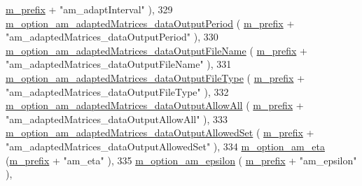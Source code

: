 \begin{DoxyCode}
      \hyperlink{class_q_u_e_s_o_1_1_metropolis_hastings_s_g_options_a4f7c510aaa530336d24259e2a89f5d0b}{m\_prefix} + \textcolor{stringliteral}{"am\_adaptInterval"}                          ),
329   \hyperlink{class_q_u_e_s_o_1_1_metropolis_hastings_s_g_options_ac9a445e5def0140cc6cda1288bce2766}{m\_option\_am\_adaptedMatrices\_dataOutputPeriod}       (
      \hyperlink{class_q_u_e_s_o_1_1_metropolis_hastings_s_g_options_a4f7c510aaa530336d24259e2a89f5d0b}{m\_prefix} + \textcolor{stringliteral}{"am\_adaptedMatrices\_dataOutputPeriod"}       ),
330   \hyperlink{class_q_u_e_s_o_1_1_metropolis_hastings_s_g_options_a50b5f394825d9c8848d11bd7636e2b5c}{m\_option\_am\_adaptedMatrices\_dataOutputFileName}     (
      \hyperlink{class_q_u_e_s_o_1_1_metropolis_hastings_s_g_options_a4f7c510aaa530336d24259e2a89f5d0b}{m\_prefix} + \textcolor{stringliteral}{"am\_adaptedMatrices\_dataOutputFileName"}     ),
331   \hyperlink{class_q_u_e_s_o_1_1_metropolis_hastings_s_g_options_a0f0a406b0e8cce9d82a4534dfb45c23b}{m\_option\_am\_adaptedMatrices\_dataOutputFileType}     (
      \hyperlink{class_q_u_e_s_o_1_1_metropolis_hastings_s_g_options_a4f7c510aaa530336d24259e2a89f5d0b}{m\_prefix} + \textcolor{stringliteral}{"am\_adaptedMatrices\_dataOutputFileType"}     ),
332   \hyperlink{class_q_u_e_s_o_1_1_metropolis_hastings_s_g_options_ac45686ae902b17824aa18e6414fc9039}{m\_option\_am\_adaptedMatrices\_dataOutputAllowAll}     (
      \hyperlink{class_q_u_e_s_o_1_1_metropolis_hastings_s_g_options_a4f7c510aaa530336d24259e2a89f5d0b}{m\_prefix} + \textcolor{stringliteral}{"am\_adaptedMatrices\_dataOutputAllowAll"}     ),
333   \hyperlink{class_q_u_e_s_o_1_1_metropolis_hastings_s_g_options_a850b7d178f40d3afbfc2e82cbbcaf25f}{m\_option\_am\_adaptedMatrices\_dataOutputAllowedSet}   (
      \hyperlink{class_q_u_e_s_o_1_1_metropolis_hastings_s_g_options_a4f7c510aaa530336d24259e2a89f5d0b}{m\_prefix} + \textcolor{stringliteral}{"am\_adaptedMatrices\_dataOutputAllowedSet"}   ),
334   \hyperlink{class_q_u_e_s_o_1_1_metropolis_hastings_s_g_options_af33c4f035c1e61c9c2109621ee2c61df}{m\_option\_am\_eta}                                    (\hyperlink{class_q_u_e_s_o_1_1_metropolis_hastings_s_g_options_a4f7c510aaa530336d24259e2a89f5d0b}{m\_prefix} + \textcolor{stringliteral}{"am\_eta"}           
                               ),
335   \hyperlink{class_q_u_e_s_o_1_1_metropolis_hastings_s_g_options_a7a7a303ed2fc5905cb58a42ea53c1d66}{m\_option\_am\_epsilon}                                (
      \hyperlink{class_q_u_e_s_o_1_1_metropolis_hastings_s_g_options_a4f7c510aaa530336d24259e2a89f5d0b}{m\_prefix} + \textcolor{stringliteral}{"am\_epsilon"}                                ),

\end{DoxyCode}
